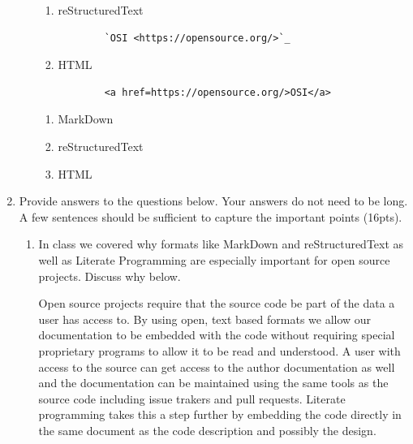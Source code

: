 \documentclass[10pt]{article}
\begin{document}
\begin{enumerate}
\begin{enumerate}
\begin{enumerate}
	\item reStructuredText
	\begin{verbatim}
		`OSI <https://opensource.org/>`_
	\end{verbatim}
	
	\item HTML
	\begin{verbatim}
		<a href=https://opensource.org/>OSI</a>
	\end{verbatim}
	
\end{enumerate}
\else
\begin{enumerate}
	\item MarkDown
	\bigskip
	\bigskip
	\bigskip
	\bigskip
	\bigskip
	\bigskip
	\bigskip
	\item reStructuredText
	\bigskip
	\bigskip
	\bigskip
	\bigskip
	\bigskip
	\bigskip
	\bigskip
	\item HTML
	\bigskip
	\bigskip
	\bigskip
	\bigskip
	\bigskip
	\bigskip
	\bigskip
\end{enumerate}
\fi

\newpage

\end{enumerate}

\item Provide answers to the questions below. Your answers do not need to be long. A few sentences should be sufficient to capture the important points (16pts).

\begin{enumerate}
	\item In class we covered why formats like MarkDown and reStructuredText as well as Literate Programming are especially important for open source projects. Discuss why below. 
	
	\beginanswers
	Open source projects require that the source code be part of the data a user has access to. By using open, text based formats we allow our documentation to be embedded with the code without requiring special proprietary programs to allow it to be read and understood. A user with access to the source can get access to the author documentation as well and the documentation can be maintained using the same tools as the source code including issue trakers and pull requests. Literate programming takes this a step further by embedding the code directly in the same document as the code description and possibly the design.
	\else
	\bigskip
	\bigskip
	\bigskip
	\bigskip
	\bigskip
	\bigskip
	\bigskip
	\bigskip
	\bigskip
	\bigskip
\bigskip
\bigskip
\bigskip
\bigskip
\bigskip
\bigskip
\bigskip
\bigskip
\bigskip
\bigskip
	\fi


\end{enumerate}
\end{enumerate}
\end{document}
